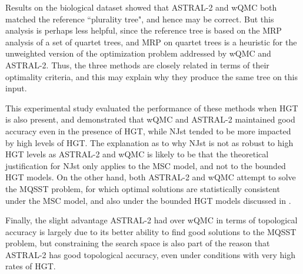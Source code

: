 Results on the biological dataset showed that ASTRAL-2 and
wQMC both matched the reference ``plurality tree", and
hence may be correct. But this analysis is perhaps less helpful, since
the reference tree is based on the MRP analysis of a set of quartet
trees, and MRP on quartet trees is a heuristic for the unweighted
version of the optimization problem addressed by wQMC and ASTRAL-2.
Thus, the three methods are closely related in terms of their
optimality criteria, and this may explain why they produce 
the same tree on this input.


This experimental study evaluated the
performance of these methods when HGT is also present, and demonstrated that
wQMC and ASTRAL-2 maintained good accuracy even in the presence of HGT, while NJst tended
to be more impacted by high levels of HGT. 
The explanation as to why NJst is not as robust to high HGT levels as ASTRAL-2 and
wQMC is likely to be that the theoretical justification for NJst only
applies to the MSC model, and not to the
bounded HGT models. 
On the other hand, both ASTRAL-2 and wQMC attempt to solve the 
MQSST problem, for which
optimal solutions are statistically consistent under the MSC model,
and also under the bounded HGT models discussed in \cite{RochSnir}.

Finally, the slight advantage ASTRAL-2 had over wQMC in terms
of topological accuracy is largely due to its
better ability to find good solutions to the MQSST problem, but
constraining the search space is also part of the reason that
ASTRAL-2 has  good topological accuracy, even under conditions
with very high rates of HGT.



